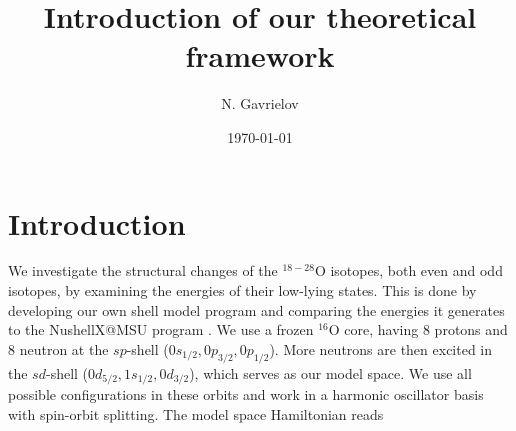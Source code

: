 \documentclass[aps,prl,reprint,groupedaddress]{revtex4-1}  %
\begin{document}
\title{Introduction of our theoretical framework}


\author{N. Gavrielov}
\affiliation{}


\date{\today}

\begin{abstract}
\end{abstract}

\pacs{}

\maketitle


\section{Introduction}

We investigate the structural changes of the $^{18-28}$O isotopes, both even and odd isotopes, by examining the energies of their low-lying states. This is done by developing our own shell model program and comparing the energies it generates to the NushellX@MSU program \cite{Brown2014}. 
We use a frozen $^{16}$O core, having 8 protons and 8 neutron at the $sp$-shell ($0s_{1/2},0p_{3/2},0p_{1/2}$). 
More neutrons are then excited in the $sd$-shell ($0d_{5/2},1s_{1/2},0d_{3/2}$), which serves as our model space. We use all possible configurations in these orbits and work in a harmonic oscillator basis with spin-orbit splitting. 
The model space Hamiltonian reads
\end{document}
